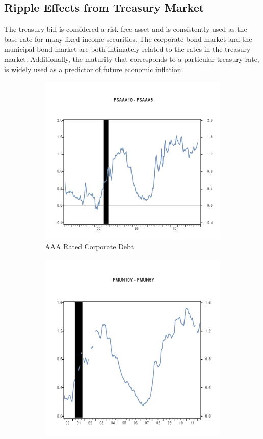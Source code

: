 \subsection{Ripple Effects from Treasury Market}
The treasury bill is considered a risk-free asset and is consistently used as the base rate for many fixed income securities.  The corporate bond market and the municipal bond market are both intimately related to the rates in the treasury market.  Additionally, the maturity that corresponds to a particular treasury rate, is widely used as a predictor of future economic inflation.

\begin{figure}[H]
\centering
\begin{subfigure}{.5\textwidth}
  \centering
  \includegraphics[width=1.0\linewidth]{figure/Corp10Year_5Year.png}
  \caption{AAA Rated Corporate Debt}
  \label{fig:corp}
\end{subfigure}%
\begin{subfigure}{.5\textwidth}
  \centering
  \includegraphics[width=0.9\linewidth]{figure/NewMuni.png}

\end{subfigure}
\end{figure}

